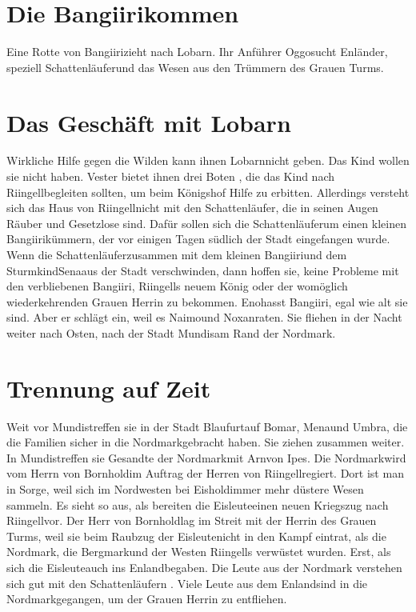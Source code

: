 \documentclass[12pt,a4paper,onecolumn,twoside,ngerman]{book}
\newcommand{\Sena}{Sena}
\newcommand{\Sturmkind}{Sturmkind}
\newcommand{\Bangiri}{Bangiiri}
\newcommand{\Oggo}{Oggo}
\newcommand{\Enland}{Enland}
\newcommand{\Enlaender}{Enländer}
\newcommand{\Schattenlaufer}{Schattenläufer}
\newcommand{\Eno}{Eno}
\newcommand{\Bomar}{Bomar}
\newcommand{\Nox}{Nox}
\newcommand{\Mena}{Mena}
\newcommand{\Umbra}{Umbra}
\newcommand{\Lobarn}{Lobarn}
\newcommand{\Vester}{Vester}
\newcommand{\Naimo}{Naimo}
\newcommand{\Nordmark}{Nordmark}
\newcommand{\Bergmark}{Bergmark}
\newcommand{\Ipes}{Ipes}
\newcommand{\Bornhold}{Bornhold}
\newcommand{\Eishold}{Eishold}
\newcommand{\Arn}{Arn}
\newcommand{\Eisleute}{Eisleute}
\newcommand{\Rhingell}{Riingell}
\newcommand{\Blaufurt}{Blaufurt}
\newcommand{\Mundis}{Mundis}
\begin{document}
\section{Die \Bangiri kommen}
Eine Rotte von \Bangiri  zieht nach \Lobarn . Ihr Anführer \Oggo  sucht \Enlaender , speziell \Schattenlaufer  und das Wesen aus den Trümmern des Grauen Turms. 

\section{Das Geschäft mit \Lobarn}
Wirkliche Hilfe gegen die Wilden kann ihnen \Lobarn nicht geben. Das Kind wollen sie nicht haben. \Vester 
  bietet ihnen drei Boten , die das Kind nach \Rhingell  begleiten sollten, um beim Königshof Hilfe zu erbitten. Allerdings versteht sich das Haus von \Rhingell nicht mit den \Schattenlaufer, die in seinen Augen Räuber und Gesetzlose sind. Dafür sollen sich die \Schattenlaufer  um einen kleinen \Bangiri   kümmern, der vor einigen Tagen südlich der Stadt eingefangen wurde. 
Wenn die \Schattenlaufer  zusammen mit dem kleinen \Bangiri  und dem \Sturmkind  \Sena  aus der Stadt verschwinden, dann hoffen sie, keine Probleme mit den verbliebenen \Bangiri , \Rhingell s neuem König oder der womöglich wiederkehrenden Grauen Herrin zu bekommen. 
\Eno  hasst \Bangiri , egal wie alt sie sind. Aber er schlägt ein, weil es \Naimo  und \Nox  anraten. Sie fliehen in der Nacht weiter nach Osten, nach der Stadt \Mundis  am Rand der \Nordmark .


\section{Trennung auf Zeit}
Weit vor \Mundis  treffen sie in der Stadt \Blaufurt  auf \Bomar , \Mena  und \Umbra , die die Familien sicher in die \Nordmark  gebracht haben. Sie ziehen zusammen weiter. In \Mundis  treffen sie Gesandte der \Nordmark  mit \Arn  von \Ipes . Die \Nordmark wird vom Herrn von \Bornhold im Auftrag der Herren von \Rhingell regiert. Dort ist man in Sorge, weil sich im Nordwesten bei \Eishold  immer mehr düstere Wesen sammeln. Es sieht so aus, als bereiten die \Eisleute  einen neuen Kriegszug nach \Rhingell  vor.
Der Herr von \Bornhold  lag im Streit mit der Herrin des Grauen Turms, weil sie beim Raubzug der \Eisleute  nicht in den Kampf eintrat, als die \Nordmark , die \Bergmark  und der Westen \Rhingell{s} verwüstet wurden. Erst, als sich die \Eisleute  auch ins \Enland  begaben. Die Leute aus der \Nordmark   
  verstehen sich gut mit den \Schattenlaufer{n} . Viele Leute aus dem \Enland  sind in die \Nordmark   gegangen, um der Grauen Herrin zu entfliehen. 
\end{document}
